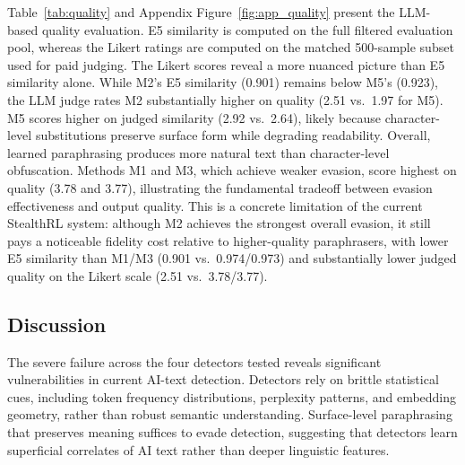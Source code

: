 \documentclass[11pt]{article}
\begin{document}
Table~\ref{tab:quality} and Appendix Figure~\ref{fig:app_quality} present the LLM-based quality evaluation. E5 similarity is computed on the full filtered evaluation pool, whereas the Likert ratings are computed on the matched 500-sample subset used for paid judging. The Likert scores reveal a more nuanced picture than E5 similarity alone. While M2's E5 similarity (0.901) remains below M5's (0.923), the LLM judge rates M2 substantially higher on quality (2.51 vs.\ 1.97 for M5). M5 scores higher on judged similarity (2.92 vs.\ 2.64), likely because character-level substitutions preserve surface form while degrading readability. Overall, learned paraphrasing produces more natural text than character-level obfuscation. Methods M1 and M3, which achieve weaker evasion, score highest on quality (3.78 and 3.77), illustrating the fundamental tradeoff between evasion effectiveness and output quality. This is a concrete limitation of the current StealthRL system: although M2 achieves the strongest overall evasion, it still pays a noticeable fidelity cost relative to higher-quality paraphrasers, with lower E5 similarity than M1/M3 (0.901 vs.\ 0.974/0.973) and substantially lower judged quality on the Likert scale (2.51 vs.\ 3.78/3.77).

\begin{table}[H]
  \centering
  \small
  \setlength{\tabcolsep}{6pt}
  \resizebox{\columnwidth}{!}{}
  \caption{Quality and similarity metrics. E5 Sim.\ is embedding cosine similarity computed on the full filtered evaluation pool. Quality and Similarity are mean Likert scores (1--5) from a gpt-5-nano judge on 500 matched samples for methods M1--M5; M0 reports automatic metrics only. Higher is better for all quality metrics; higher ASR is better for evasion.}
  \label{tab:quality}
\end{table}

\subsection{Discussion}

The severe failure across the four detectors tested reveals significant vulnerabilities in current AI-text detection. Detectors rely on brittle statistical cues, including token frequency distributions, perplexity patterns, and embedding geometry, rather than robust semantic understanding. Surface-level paraphrasing that preserves meaning suffices to evade detection, suggesting that detectors learn superficial correlates of AI text rather than deeper linguistic features.
\end{document}
